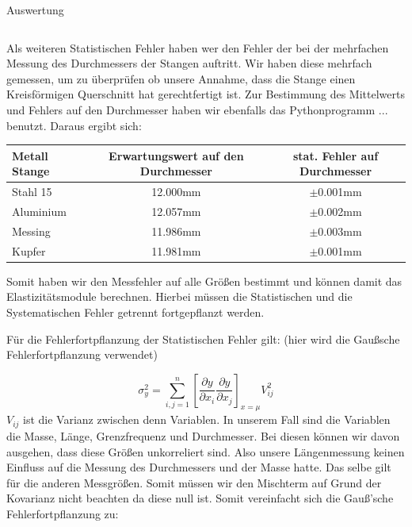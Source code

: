 \documentclass[twoside]{protokoll}
\begin{document}
\begin{aufgabe}{Auswertung}
\begin{table}[H]
\begin{tabularx}{1\textwidth}{X X X X}
            \bottomrule
        \end{tabularx}
        \label{tab:mytable}
    \end{table}
    
Als weiteren Statistischen Fehler haben wer den Fehler der bei der mehrfachen Messung des Durchmessers der Stangen auftritt.
Wir haben diese mehrfach gemessen, um zu überprüfen ob unsere Annahme, dass die Stange einen 
Kreisförmigen Querschnitt hat gerechtfertigt ist. Zur Bestimmung des Mittelwerts und Fehlers auf den Durchmesser 
haben wir ebenfalls das Pythonprogramm ... benutzt. 
Daraus ergibt sich:\\

 \begin{table}[H]
        \centering
        \begin{tabularx}{1.0\textwidth}{X c c} %
            \toprule
            \textbf{Metall Stange} & \textbf{Erwartungswert auf den Durchmesser} & \textbf{stat. Fehler auf Durchmesser} \\
            \midrule
            Stahl 15 & 12.000mm & $\pm$0.001mm \\
            Aluminium & 12.057mm & $\pm$0.002mm  \\
            Messing & 11.986mm & $\pm$0.003mm \\
            Kupfer & 11.981mm & $\pm$0.001mm \\
            \bottomrule
        \end{tabularx}
        \label{tab:mytable}
    \end{table}

Somit haben wir den Messfehler auf alle Größen bestimmt und können damit das Elastizitätsmodule berechnen. Hierbei müssen die Statistischen und die Systematischen Fehler getrennt fortgepflanzt werden.

Für die Fehlerfortpflanzung der Statistischen Fehler gilt: (hier wird die Gaußsche Fehlerfortpflanzung verwendet) 

\begin{equation}
	\sigma_y^2 = \sum_{i,j=1}^n\left[\frac{\partial y}{\partial x_i}\frac{\partial y}{\partial x_j}\right]_{x=\mu}V_{ij}^2
\end{equation}
$V_{ij}$ ist die Varianz zwischen denn Variablen. In unserem Fall sind die Variablen die Masse, Länge, Grenzfrequenz und Durchmesser. 
Bei diesen können wir davon ausgehen, dass diese Größen unkorreliert sind. 
Also unsere Längenmessung keinen Einfluss auf die Messung des Durchmessers und der Masse hatte.
Das selbe gilt für die anderen Messgrößen. 
Somit müssen wir den Mischterm auf Grund der Kovarianz nicht beachten da diese null ist.
Somit vereinfacht sich die Gauß'sche Fehlerfortpflanzung zu:


\end{aufgabe}
\end{document}
